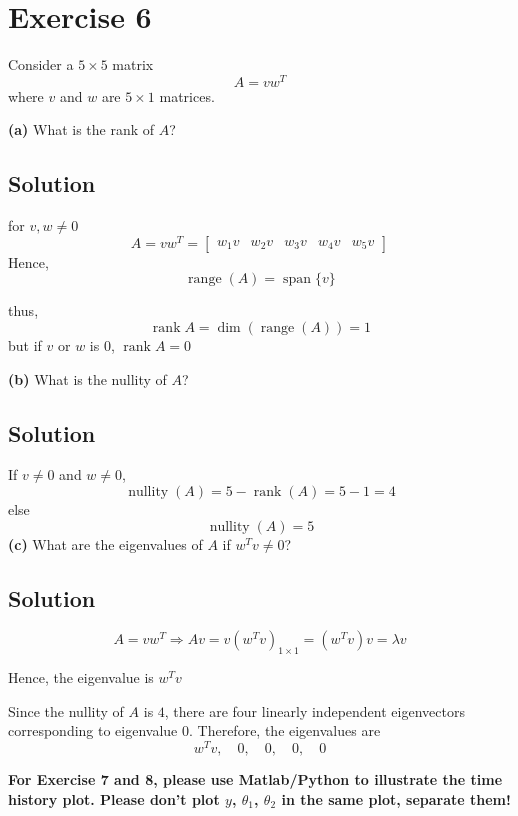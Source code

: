 \documentclass[12pt,a4paper]{article}
\begin{document}
\section*{Exercise 6}
Consider a $5\times5$ matrix
\[A=vw^T\]
where $v$ and $w$ are $5\times1$ matrices.

\textbf{(a)} What is the rank of $A$?
\subsection*{Solution}
for $v, w \neq 0$
 \[
 A = vw^T = \begin{bmatrix}
 	w_1v & w_2v & w_3v & w_4v & w_5v
 \end{bmatrix}
 \]
 Hence, 
\[
\operatorname{range}(A) = \operatorname{span}\{v\}
\]

thus, 
\[
\operatorname{rank} A = \operatorname{dim} (\operatorname{range} (A))= 1
\]
but if $v$ or $w$ is $0$, $\operatorname{rank}A=0$

\vspace{0.25cm}
\textbf{(b)} What is the nullity of $A$?
\subsection*{Solution}
If $v\neq0$ and $w\neq0$,
\[
\operatorname{nullity}(A)=5-\operatorname{rank}(A)=5-1=4
\]
else
\[
\operatorname{nullity}(A)=5
\]
\textbf{(c)} What are the eigenvalues of $A$ if $w^Tv\neq0$?
\subsection*{Solution}
\[
A = vw^T \Rightarrow Av = v(w^Tv)_{1\times1} = (w^Tv)v = \lambda v
\]

Hence, the eigenvalue is $w^Tv$

Since the nullity of $A$ is $4$, there are four linearly independent eigenvectors corresponding to eigenvalue $0$. Therefore, the eigenvalues are 
\[
w^Tv,\quad 0, \quad 0, \quad 0, \quad 0
\]
\vspace{0.25cm}

\textbf{For Exercise 7 and 8, please use Matlab/Python to illustrate the time history plot. Please don't plot $y$, $\theta_1$, $\theta_2$ in the same plot, separate them!}
\end{document}
